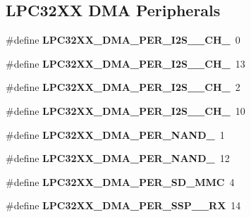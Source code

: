 \subsection*{L\+P\+C32\+XX D\+MA Peripherals}
\begin{DoxyCompactItemize}
\item 
\mbox{\label{group__lpc__dma_ga74b24e02fc46378726c6175cabd351a8}} 
\#define {\bfseries L\+P\+C32\+X\+X\+\_\+\+D\+M\+A\+\_\+\+P\+E\+R\+\_\+\+I2\+S\+\_\+\_\+\+C\+H\+\_}~0
\item 
\mbox{\label{group__lpc__dma_ga15cc00f2c9bd7322c43b9105a75d133d}} 
\#define {\bfseries L\+P\+C32\+X\+X\+\_\+\+D\+M\+A\+\_\+\+P\+E\+R\+\_\+\+I2\+S\+\_\+\_\+\+C\+H\+\_}~13
\item 
\mbox{\label{group__lpc__dma_ga077a14ec5596ff336cab0dec45e9007c}} 
\#define {\bfseries L\+P\+C32\+X\+X\+\_\+\+D\+M\+A\+\_\+\+P\+E\+R\+\_\+\+I2\+S\+\_\+\_\+\+C\+H\+\_}~2
\item 
\mbox{\label{group__lpc__dma_ga6ea639239dfa86481c8589bbc2d5a965}} 
\#define {\bfseries L\+P\+C32\+X\+X\+\_\+\+D\+M\+A\+\_\+\+P\+E\+R\+\_\+\+I2\+S\+\_\+\_\+\+C\+H\+\_}~10
\item 
\mbox{\label{group__lpc__dma_ga9691083d75bb25e10e56cb5633edf89b}} 
\#define {\bfseries L\+P\+C32\+X\+X\+\_\+\+D\+M\+A\+\_\+\+P\+E\+R\+\_\+\+N\+A\+N\+D\+\_}~1
\item 
\mbox{\label{group__lpc__dma_ga94e829f103c874d180089288493851c2}} 
\#define {\bfseries L\+P\+C32\+X\+X\+\_\+\+D\+M\+A\+\_\+\+P\+E\+R\+\_\+\+N\+A\+N\+D\+\_}~12
\item 
\mbox{\label{group__lpc__dma_ga4cb59449479e25d1a5579c000fd41413}} 
\#define {\bfseries L\+P\+C32\+X\+X\+\_\+\+D\+M\+A\+\_\+\+P\+E\+R\+\_\+\+S\+D\+\_\+\+M\+MC}~4
\item 
\mbox{\label{group__lpc__dma_ga83990066d401ed314050c06b9347f9ad}} 
\#define {\bfseries L\+P\+C32\+X\+X\+\_\+\+D\+M\+A\+\_\+\+P\+E\+R\+\_\+\+S\+S\+P\+\_\+\_\+\+RX}~14
\item 
\mbox{\label{group__lpc__dma_ga6a9bf44e82fec17ffb5519b08156ed8c}} 

\end{DoxyCompactItemize}
